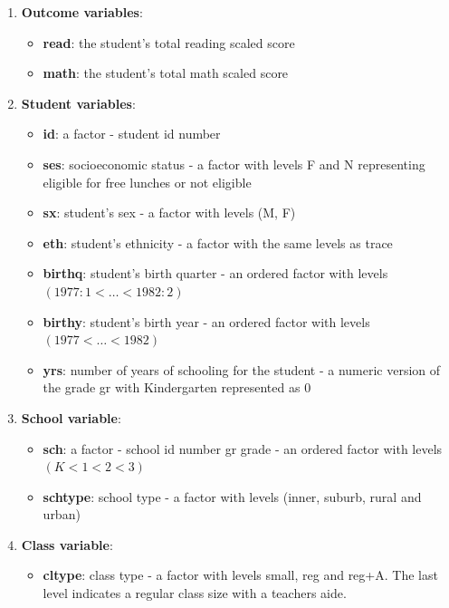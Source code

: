 \documentclass{article}
\begin{document}
\begin{enumerate}[1]

    \item \textbf{Outcome variables}:
        \begin{itemize}
            \item \textbf{read}: the student’s total reading scaled score
            \item \textbf{math}: the student’s total math scaled score 
        \end{itemize}

	\item \textbf{Student variables}:
        \begin{itemize}
            \item \textbf{id}: a factor - student id number 
            \item \textbf{ses}: socioeconomic status - a factor with levels F and N representing eligible for free lunches or not eligible 
            \item \textbf{sx}: student’s sex - a factor with levels (M, F) 
            \item \textbf{eth}: student’s ethnicity - a factor with the same levels as trace 
            \item \textbf{birthq}: student’s birth quarter - an ordered factor with levels $(1977:1 < \dots < 1982:2)$
            \item \textbf{birthy}: student’s birth year - an ordered factor with levels $(1977 < \dots < 1982)$
            \item \textbf{yrs}: number of years of schooling for the student - a numeric version of the grade gr with Kindergarten 
            represented as 0
        \end{itemize}

    \item \textbf{School variable}:
        \begin{itemize}
            \item \textbf{sch}: a factor - school id number gr grade - an ordered factor with levels $(K < 1 < 2 < 3)$
            \item \textbf{schtype}: school type - a factor with levels (inner, suburb, rural and urban)
        \end{itemize}

    \item \textbf{Class variable}:
        \begin{itemize}
            \item \textbf{cltype}: class type - a factor with levels small, reg and reg+A. The last level indicates a regular class 
            size with a teachers aide.
        \end{itemize}


\end{enumerate}
\end{document}

